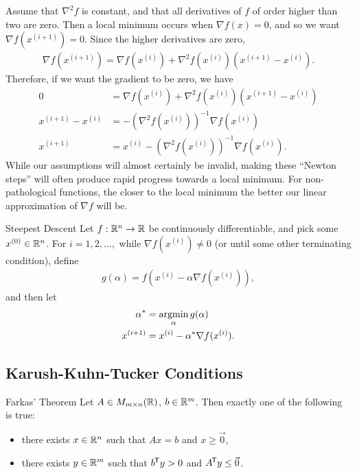 \begin{rmk}
    Assume that $\nabla^2f$ is constant, and that all derivatives of $f$ of order higher than two are zero. Then a local minimum occurs when $\nabla f(x) = 0$, and so we want $\nabla f(x^{(i+1)}) = 0$. Since the higher derivatives are zero,
    \begin{align*}
        \nabla f(x^{(i+1)}) = \nabla f(x^{(i)}) + \nabla^2f(x^{(i)})(x^{(i+1)} - x^{(i)}).
    \end{align*}
    Therefore, if we want the gradient to be zero, we have
    \begin{align*}
        0 &= \nabla f(x^{(i)}) + \nabla^2f(x^{(i)})(x^{(i+1)} - x^{(i)}) \\
        x^{(i+1)} - x^{(i)} &= -\left(\nabla^2f(x^{(i)})\right)^{-1}\nabla f(x^{(i)}) \\
        x^{(i+1)} &= x^{(i)} - \left(\nabla^2f(x^{(i)})\right)^{-1}\nabla f(x^{(i)}).
    \end{align*}
    While our assumptions will almost certainly be invalid, making these ``Newton steps'' will often produce rapid progress towards a local minimum. For non-pathological functions, the closer to the local minimum the better our linear approximation of $\nabla f$ will be.
\end{rmk}

\begin{defn}{Steepest Descent}\label{steepest-method}\proofbreak
    Let $f: \mathbb{R}^n \to \mathbb{R}$ be continuously differentiable, and pick some $x^{(0)} \in \mathbb{R}^n$. 
    For $i = 1, 2, \ldots, $ while $\nabla f(x^{(i)}) \neq 0$ (or until some other terminating condition), define
    \begin{align*}
        g(\alpha) = f(x^{(i)} - \alpha\nabla f(x^{(i)})),
    \end{align*}
    and then let
    \begin{align*}
        \alpha^* &= \operatorname*{argmin}_{\alpha}g(\alpha) \\
        x^{(i+1)} &= x^{(i)} - \alpha^{*}\nabla f(x^{(i)}).
    \end{align*}
\end{defn}

\subsection{Karush-Kuhn-Tucker Conditions}

\begin{thm}{Farkas' Theorem}\label{farkas}\proofbreak
    Let $A \in M_{m \times n}(\mathbb{R})$, $b \in \mathbb{R}^m$. Then exactly one of the following is true:
    \begin{itemize}
        \item there exists $x \in \mathbb{R}^n$ such that $Ax = b$ and $x \geq \vec{0}$,
        \item there exists $y \in \mathbb{R}^m$ such that ${b}^{\mkern-1.5mu\mathsf{T}}y > 0$ and ${A}^{\mkern-1.5mu\mathsf{T}}y \leq \vec{0}$.
    \end{itemize}
\end{thm}

